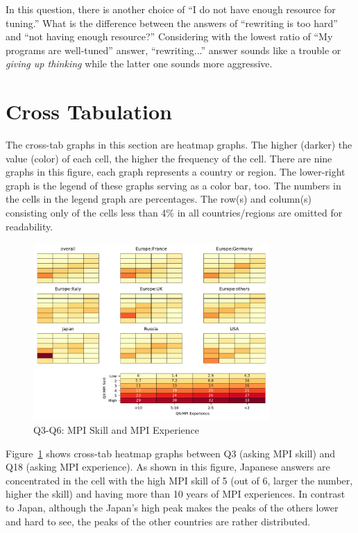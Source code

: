 \documentclass[submit,techrep,noauthor,english]{ipsj}
\begin{document}
In this question, there is another choice of ``I do not have
enough resource for tuning.'' What is the difference between the
answers of ``rewriting is too hard'' and ``not having enough
resource?'' Considering with the lowest ratio of ``My programs are
well-tuned'' answer, ``rewriting...'' answer sounds like a trouble or
{\it giving up thinking} while the latter one sounds more aggressive.

\section{Cross Tabulation}

The cross-tab graphs in this section are heatmap graphs. The
higher (darker) the value (color) of each cell, the higher the
frequency of the cell. There are nine graphs in this figure, each
graph represents a country or region. The lower-right graph is the
legend of these graphs serving as a color bar, too. The numbers in the
cells in the legend graph are percentages. The row(s) and column(s)
consisting only of the cells less than 4\% in all countries/regions
are omitted for readability.

\begin{figure}[htb]
\begin{center}
\includegraphics[width=9cm]{../pdfs/Q3-Q6.pdf}
\caption{Q3-Q6: MPI Skill and MPI Experience}
\label{fig:q3-q6}
\end{center}
\end{figure}

Figure~\ref{fig:q3-q6} shows cross-tab heatmap graphs between
Q3 (asking MPI skill) and Q18 (asking MPI experience). As shown in
this figure, Japanese answers are concentrated in the cell with the high
MPI skill of 5 (out of 6, larger the number, higher the skill) and
having more than 10 years of MPI experiences. In contrast to Japan,
although the Japan's high peak makes the peaks of the others lower and
hard to see, the peaks of the other countries are rather distributed. 
\end{document}
